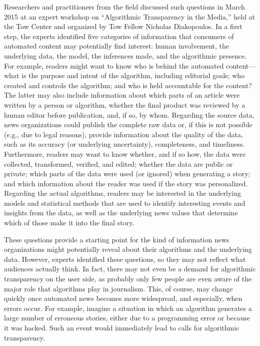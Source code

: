 \documentclass[notoc, symmetric, nobib, nols]{towcenter-book}
\begin{document}
Researchers and practitioners from the field discussed such questions in March 2015 at an expert workshop on ``Algorithmic Transparency in the Media,'' held at the Tow Center and organized by Tow Fellow Nicholas Diakopoulos. In a first step, the experts identified five categories of information that consumers of automated content may potentially find interest: human involvement, the underlying data, the model, the inferences made, and the algorithmic presence.\cite{diak15} For example, readers might want to know who is behind the automated content---what is the purpose and intent of the algorithm, including editorial goals; who created and controls the algorithm; and who is held accountable for the content? The latter may also include information about which parts of an article were written by a person or algorithm, whether the final product was reviewed by a human editor before publication, and, if so, by whom. Regarding the source data, news organizations could publish the complete raw data or, if this is not possible (e.g., due to legal reasons), provide information about the quality of the data, such as its accuracy (or underlying uncertainty), completeness, and timeliness. Furthermore, readers may want to know whether, and if so how, the data were collected, transformed, verified, and edited; whether the data are public or private; which parts of the data were used (or ignored) when generating a story; and which information about the reader was used if the story was personalized. Regarding the actual algorithms, readers may be interested in the underlying models and statistical methods that are used to identify interesting events and insights from the data, as well as the underlying news values that determine which of those make it into the final story. 

These questions provide a starting point for the kind of information news organizations might potentially reveal about their algorithms and the underlying data. However, experts identified these questions, so they may not reflect what audiences actually think. In fact, there may not even be a demand for algorithmic transparency on the user side, as probably only few people are even aware of the major role that algorithms play in journalism. This, of course, may change quickly once automated news becomes more widespread, and especially, when errors occur. For example, imagine a situation in which an algorithm generates a large number of erroneous stories, either due to a programming error or because it was hacked. Such an event would immediately lead to calls for algorithmic transparency. 
\end{document}

